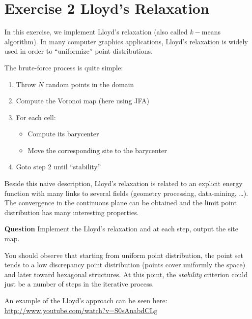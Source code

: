 \documentclass[a4paper, 11pt]{article}
\begin{document}
\section*{Exercise 2 \rm Lloyd's Relaxation}

\par In this exercise, we implement Lloyd's relaxation (also called $k-$means algorithm).  In many computer graphics applications, Lloyd's relaxation is widely used in order to ``uniformize'' point distributions.

The brute-force process is quite simple:
\begin{enumerate}
	\item Throw $N$ random points in the domain
	\item Compute the Voronoi map (here using JFA)
	\item For each cell:
	\begin{itemize}
		\item Compute its barycenter
		\item Move the corresponding site to the barycenter
	\end{itemize}
	\item Goto step 2 until ``stability''
\end{enumerate}

\par Beside this naive description, Lloyd's relaxation is related to an explicit energy function with many links to several fields (geometry processing, data-mining, \ldots). The convergence in the continuous plane can be obtained and the limit point distribution has many interesting properties.

\bigskip
{\bf Question} Implement the Lloyd's relaxation and at each step, output the site map.

\bigskip
\par You should observe that starting from uniform point distribution, the point set tends to a low discrepancy point distribution (points cover uniformly the space) and later toward hexagonal structures. At this point, the \emph{stability} criterion could just be a number of steps in the iterative process.

\par An example of the Lloyd's approach can be seen here: \url{http://www.youtube.com/watch?v=S0sAnabdCLg}
\end{document}
